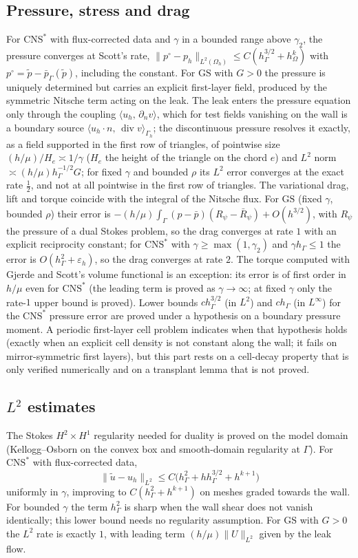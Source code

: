 \documentclass[pdflatex,sn-mathphys-num]{sn-jnl}
\theoremstyle{thmstyleone}
\theoremstyle{thmstylethree}
\newcommand{\hG}{h_\Gamma}
\newcommand{\hO}{h_\Omega}
\newcommand{\Gh}{\Gamma_h}
\newcommand{\Oh}{\Omega_h}
\newcommand{\dn}{\partial_n}
\newcommand{\ut}{\tilde u}
\newcommand{\pt}{\tilde p}
\newcommand{\pbar}{\bar p}
\newcommand{\pbG}{\bar p_{\Gamma}}
\newcommand{\ip}[2]{\langle #1,\, #2\rangle}
\newcommand{\norm}[1]{\lVert #1\rVert}
\newcommand{\GS}{\mathrm{GS}}
\newcommand{\CNS}{\mathrm{CNS}^\ast}
\newcommand{\eps}{\varepsilon_h}
\renewcommand{\div}{\operatorname{div}}
\begin{document}
\subsection{Pressure, stress and drag}
For $\CNS$ with flux-corrected data and $\gamma$ in a bounded range above $\gamma_2$, the pressure converges at Scott's rate, $\norm{p^\circ-p_h}_{L^2(\Oh)}\le C(\hG^{3/2}+\hO^k)$ with $p^\circ=\pt-\pbG(\pt)$, including the constant. For $\GS$ with $G>0$ the pressure is uniquely determined but carries an explicit first-layer field, produced by the symmetric Nitsche term acting on the leak. The leak enters the pressure equation only through the coupling $\ip{u_h}{\dn v}$, which for test fields vanishing on the wall is a boundary source $\ip{u_h\cdot n}{\div v}_{\Gh}$; the discontinuous pressure resolves it exactly, as a field supported in the first row of triangles, of pointwise size $(h/\mu)/H_e\asymp1/\gamma$ ($H_e$ the height of the triangle on the chord $e$) and $L^2$ norm $\asymp(h/\mu)\hG^{-1/2}G$; for fixed $\gamma$ and bounded $\rho$ its $L^2$ error converges at the exact rate $\frac12$, and not at all pointwise in the first row of triangles. The variational drag, lift and torque coincide with the integral of the Nitsche flux. For $\GS$ (fixed $\gamma$, bounded $\rho$) their error is $-(h/\mu)\int_\Gamma(p-\pbar)(R_\psi-\bar R_\psi)+O(h^{3/2})$, with $R_\psi$ the pressure of a dual Stokes problem, so the drag converges at rate $1$ with an explicit reciprocity constant; for $\CNS$ with $\gamma\ge\max(1,\gamma_2)$ and $\gamma\hG\le1$ the error is $O(\hG^2+\eps)$, so the drag converges at rate $2$. The torque computed with Gjerde and Scott's volume functional is an exception: its error is of first order in $h/\mu$ even for $\CNS$ (the leading term is proved as $\gamma\to\infty$; at fixed $\gamma$ only the rate-$1$ upper bound is proved).
Lower bounds $c\hG^{3/2}$ (in $L^2$) and $c\hG$ (in $L^\infty$) for the $\CNS$ pressure error are proved under a hypothesis on a boundary pressure moment. A periodic first-layer cell problem indicates when that hypothesis holds (exactly when an explicit cell density is not constant along the wall; it fails on mirror-symmetric first layers), but this part rests on a cell-decay property that is only verified numerically and on a transplant lemma that is not proved.

\subsection{\texorpdfstring{$L^2$}{L2} estimates}
The Stokes $H^2\times H^1$ regularity needed for duality is proved on the model domain (Kellogg--Osborn \cite{KelloggOsborn1976} on the convex box and smooth-domain regularity at $\Gamma$). For $\CNS$ with flux-corrected data,
\[
\norm{\ut-u_h}_{L^2}\le C\bigl(\hG^2+h\hG^{3/2}+h^{k+1}\bigr)
\]
uniformly in $\gamma$, improving to $C(\hG^2+h^{k+1})$ on meshes graded towards the wall. For bounded $\gamma$ the term $\hG^2$ is sharp when the wall shear does not vanish identically; this lower bound needs no regularity assumption. For $\GS$ with $G>0$ the $L^2$ rate is exactly $1$, with leading term $(h/\mu)\norm{U}_{L^2}$ given by the leak flow.
\end{document}

